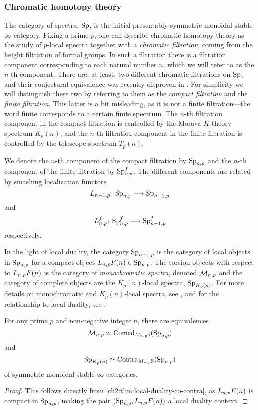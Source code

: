 \subsubsection*{Chromatic homotopy theory}

The category of spectra, $\mathrm{Sp}$, is the initial presentably symmetric monoidal stable $\infty$-category. Fixing a prime $p$, one can describe chromatic homotopy theory as the study of $p$-local spectra together with a \emph{chromatic filtration}, coming from the height filtration of formal groups. In such a filtration there is a filtration component corresponding to each natural number $n$, which we will refer to as the $n$-th component. There are, at least, two different chromatic filtrations on $\mathrm{Sp}$, and their conjectural equivalence was recently disproven in \cite{burklund-hahn-levy-schlank_23}. For simplicity we will distinguish these two by referring to them as the \emph{compact filtration} and the \emph{finite filtration}. This latter is a bit misleading, as it is not a finite filtration---the word finite corresponds to a certain finite spectrum. The $n$-th filtration component in the compact filtration is controlled by the Morava $K$-theory spectrum $K_p(n)$, and the $n$-th filtration component in the finite filtration is controlled by the telescope spectrum $T_p(n)$. 

We denote the $n$-th component of the compact filtration by $\mathrm{Sp}_{n,p}$ and the $n$-th component of the finite filtration by $\mathrm{Sp}_{n,p}^f$. The different components are related by smashing localization functors 
\[L_{n-1,p}\colon\mathrm{Sp}_{n,p} \longrightarrow \mathrm{Sp}_{n-1,p}\] 
and 
\[L_{n,p}^f\colon \mathrm{Sp}_{n,p}^f \longrightarrow \mathrm{Sp}_{n-1,p}^f\] 
respectively. 

In the light of local duality, the category $\mathrm{Sp}_{n-1,p}$ is the category of local objects in $\mathrm{Sp}_{n,p}$ for a compact object $L_{n,p} F(n) \in \mathrm{Sp}_{n,p}$. The torsion objects with respect to $L_{n,p} F(n)$ is the category of \emph{monochromatic spectra}, denoted $\mathcal{M}_{n,p}$ and the category of complete objects are the $K_p(n)$-local spectra, $\mathrm{Sp}_{K_p(n)}$. For more details on monochromatic and $K_p(n)$-local spectra, see \cite{hovey-strickland_99}, and for the relationship to local duality, see \cite[Section 6.2]{barthel-heard-valenzuela_2018}. 

\begin{proposition}
    For any prime $p$ and non-negative integer $n$, there are equivalences 
    \[\mathcal{M}_{n,p} \simeq \mathrm{Comod}_{M_{n,p}\mathbb{S}}(\mathrm{Sp}_{n,p})\] 
    and 
    \[\mathrm{Sp}_{{K_p(n)}}\simeq \mathrm{Contra}_{M_{n,p}\mathbb{S}}(\mathrm{Sp}_{n,p})\]
    of symmetric monoidal stable $\infty$-categories. 
\end{proposition}
\begin{proof}
    This follows directly from \cref{ch2:thm:local-duality-co-contra}, as $L_{n,p} F(n)$ is compact in $\mathrm{Sp}_{n,p}$, making the pair $(\mathrm{Sp}_{n,p}, L_{n,p} F(n))$ a local duality context. 
\end{proof}


